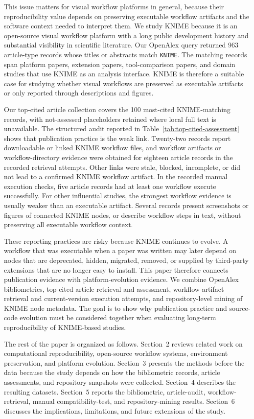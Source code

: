 \documentclass[runningheads]{llncs}
\begin{document}
This issue matters for visual workflow platforms in general, because their
reproducibility value depends on preserving executable workflow artifacts and
the software context needed to interpret them. We study KNIME because it is an
open-source visual workflow platform with a long public development history and
substantial visibility in scientific literature. Our OpenAlex query returned
963 article-type records whose titles or abstracts match \texttt{KNIME}. The
matching records span platform papers, extension papers, tool-comparison
papers, and domain studies that use KNIME as an analysis interface. KNIME is
therefore a suitable case for studying whether visual workflows are preserved
as executable artifacts or only reported through descriptions and figures.

Our top-cited article collection covers the 100 most-cited KNIME-matching
records, with not-assessed placeholders retained where local full text is
unavailable. The structured audit reported in
Table~\ref{tab:top-cited-assessment} shows that publication practice is the
weak link. Twenty-two records report downloadable or linked KNIME workflow
files, and workflow artifacts or workflow-directory evidence were obtained for eighteen article records in
the recorded retrieval attempts. Other links were stale, blocked, incomplete,
or did not lead to a confirmed KNIME workflow artifact. In the recorded manual
execution checks, five article records had at least one workflow execute
successfully. For other influential studies, the strongest workflow evidence
is usually weaker than an executable artifact. Several records present
screenshots or figures of connected KNIME nodes, or describe workflow steps in
text, without preserving all executable workflow context.

These reporting practices are risky because KNIME continues to evolve. A
workflow that was executable when a paper was written may later depend on nodes
that are deprecated, hidden, migrated, removed, or supplied by third-party
extensions that are no longer easy to install. This paper therefore connects
publication evidence with platform-evolution evidence. We combine OpenAlex
bibliometrics, top-cited article retrieval and assessment, workflow-artifact
retrieval and current-version execution attempts, and repository-level mining
of KNIME node metadata. The goal is to show why publication practice and
source-code evolution must be considered together when evaluating long-term
reproducibility of KNIME-based studies.

The rest of the paper is organized as follows. Section~2 reviews related work
on computational reproducibility, open-source workflow systems, environment
preservation, and platform evolution. Section~3 presents the methods before
the data because the study depends on how the bibliometric records, article
assessments, and repository snapshots were collected. Section~4 describes the
resulting datasets. Section~5 reports the bibliometric, article-audit,
workflow-retrieval, manual compatibility-test, and repository-mining results.
Section~6 discusses
the implications, limitations, and future extensions of the study.
\end{document}
